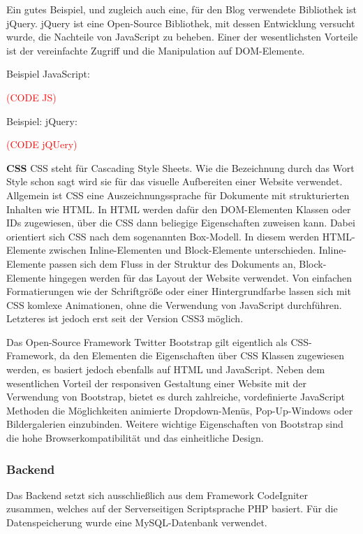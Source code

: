     Ein gutes Beispiel, und zugleich auch eine, für den Blog verwendete Bibliothek ist {jQuery\cite{jquery}}.
    jQuery ist eine Open-Source Bibliothek, mit dessen Entwicklung versucht wurde, die Nachteile von JavaScript zu beheben. Einer der wesentlichsten Vorteile ist
    der vereinfachte Zugriff und die Manipulation auf DOM-Elemente.

    Beispiel JavaScript:

    \textcolor{red}{(CODE JS)}

    Beispiel: jQuery:

    \textcolor{red}{(CODE jQUery)}

    \textbf{CSS}
    {CSS\cite{css}} steht für Cascading Style Sheets. Wie die Bezeichnung durch das Wort Style schon sagt wird sie für das visuelle Aufbereiten einer Website verwendet.
    Allgemein ist CSS eine Auszeichnungssprache für Dokumente mit strukturierten Inhalten wie HTML. In HTML werden dafür den DOM-Elementen Klassen oder IDs
    zugewiesen, über die CSS dann beliegige Eigenschaften zuweisen kann. Dabei orientiert sich CSS nach dem sogenannten Box-Modell. In diesem werden HTML-Elemente
    zwischen Inline-Elementen und Block-Elemente unterschieden. Inline-Elemente passen sich dem Fluss in der Struktur des Dokuments an, Block-Elemente hingegen
    werden für das Layout der Website verwendet. Von einfachen Formatierungen wie der Schriftgröße oder einer Hintergrundfarbe lassen sich mit CSS komlexe Animationen,
    ohne die Verwendung von JavaScript durchführen. Letzteres ist jedoch erst seit der Version CSS3 möglich.

    Das Open-Source Framework {Twitter Bootstrap\cite{bootstrap}} gilt eigentlich als CSS-Framework, da den Elementen die Eigenschaften über CSS Klassen zugewiesen werden, es basiert jedoch
    ebenfalls auf HTML und JavaScript. Neben dem wesentlichen Vorteil der responsiven Gestaltung einer Website mit der Verwendung von Bootstrap, bietet es durch
    zahlreiche, vordefinierte JavaScript Methoden die Möglichkeiten animierte Dropdown-Menüs, Pop-Up-Windows oder Bildergalerien einzubinden.
    Weitere wichtige Eigenschaften von Bootstrap sind die hohe Browserkompatibilität und das einheitliche Design.

    \subsubsection{Backend}
    Das Backend setzt sich ausschließlich aus dem Framework CodeIgniter zusammen, welches auf der Serverseitigen Scriptsprache PHP basiert. Für die Datenspeicherung
    wurde eine MySQL-Datenbank verwendet.

